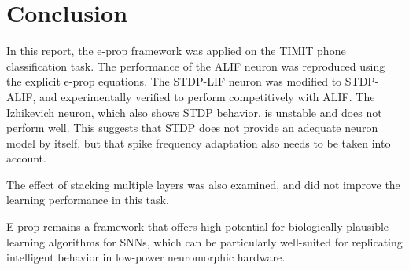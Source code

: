 \chapter{Conclusion}\label{ch:conclusion}

In this report, the e-prop framework was applied on the TIMIT phone classification task.
The performance of the ALIF neuron was reproduced using the explicit e-prop equations.
The STDP-LIF neuron was modified to STDP-ALIF, and experimentally verified to perform competitively with ALIF.
The Izhikevich neuron, which also shows STDP behavior, is unstable and does not perform well.
This suggests that STDP does not provide an adequate neuron model by itself, but that \eg spike frequency adaptation also needs to be taken into account.

The effect of stacking multiple layers was also examined, and did not improve the learning performance in this task.

E-prop remains a framework that offers high potential for biologically plausible learning algorithms for SNNs, which can be particularly well-suited for replicating intelligent behavior in low-power neuromorphic hardware.
